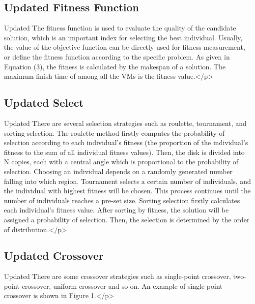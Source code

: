 \documentclass[conference]{IEEEtran}%
\begin{document}
%
\subsection{Updated Fitness Function}%
\label{subsec:UpdatedFitnessFunction}%
Updated The fitness function is used to evaluate the quality of the candidate solution, which is an important index for selecting the best individual. Usually, the value of the objective function can be directly used for fitness measurement, or define the fitness function according to the specific problem. As given in Equation (3), the fitness is calculated by the makespan of a solution. The maximum finish time of among all the VMs is the fitness value.</p>

%
\subsection{Updated Select}%
\label{subsec:UpdatedSelect}%
Updated There are several selection strategies such as roulette, tournament, and sorting selection. The roulette method firstly computes the probability of selection according to each individual’s fitness (the proportion of the individual’s fitness to the sum of all individual fitness values). Then, the disk is divided into N copies, each with a central angle which is proportional to the probability of selection. Choosing an individual depends on a randomly generated number falling into which region. Tournament selects a certain number of individuals, and the individual with highest fitness will be chosen. This process continues until the number of individuals reaches a pre-set size. Sorting selection firstly calculates each individual’s fitness value. After sorting by fitness, the solution will be assigned a probability of selection. Then, the selection is determined by the order of distribution.</p>

%
\subsection{Updated Crossover}%
\label{subsec:UpdatedCrossover}%
Updated There are some crossover strategies such as single-point crossover, two-point crossover, uniform crossover and so on. An example of single-point crossover is shown in Figure 1.</p>

%
%
%
\end{document}
